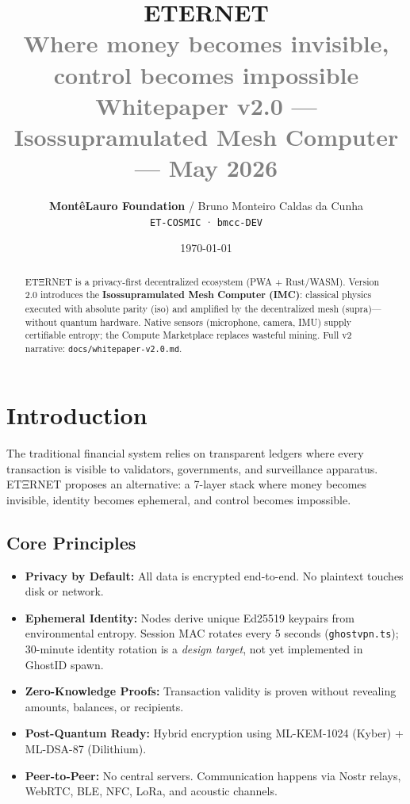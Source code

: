 \documentclass[11pt,a4paper]{article}
\title{
  \vspace{-2cm}
  \textbf{\Huge ETERNET}\\[0.3cm]
  \textcolor{gray}{\large Where money becomes invisible, control becomes impossible}\\[0.5cm]
  \textcolor{gray}{\normalsize Whitepaper v2.0 --- Isossupramulated Mesh Computer --- May 2026}
}
\author{
  \textbf{MontêLauro Foundation} / Bruno Monteiro Caldas da Cunha\\
  \texttt{ET-COSMIC} · \texttt{bmcc-DEV}
}
\date{\today}
\begin{document}
\maketitle
\thispagestyle{empty}

\begin{abstract}
\noindent
ETΞRNET is a privacy-first decentralized ecosystem (PWA + Rust/WASM). Version 2.0 introduces the \textbf{Isossupramulated Mesh Computer (IMC)}: classical physics executed with absolute parity (iso) and amplified by the decentralized mesh (supra)---without quantum hardware. Native sensors (microphone, camera, IMU) supply certifiable entropy; the Compute Marketplace replaces wasteful mining. Full v2 narrative: \texttt{docs/whitepaper-v2.0.md}.
\end{abstract}

\tableofcontents
\newpage

\section{Introduction}

The traditional financial system relies on transparent ledgers where every transaction is visible to validators, governments, and surveillance apparatus. ETΞRNET proposes an alternative: a 7-layer stack where money becomes invisible, identity becomes ephemeral, and control becomes impossible.

\subsection{Core Principles}
\begin{itemize}[nosep]
  \item \textbf{Privacy by Default:} All data is encrypted end-to-end. No plaintext touches disk or network.
  \item \textbf{Ephemeral Identity:} Nodes derive unique Ed25519 keypairs from environmental entropy. Session MAC rotates every 5 seconds (\texttt{ghostvpn.ts}); 30-minute identity rotation is a \emph{design target}, not yet implemented in GhostID spawn.
  \item \textbf{Zero-Knowledge Proofs:} Transaction validity is proven without revealing amounts, balances, or recipients.
  \item \textbf{Post-Quantum Ready:} Hybrid encryption using ML-KEM-1024 (Kyber) + ML-DSA-87 (Dilithium).
  \item \textbf{Peer-to-Peer:} No central servers. Communication happens via Nostr relays, WebRTC, BLE, NFC, LoRa, and acoustic channels.
\end{itemize}
\end{document}
